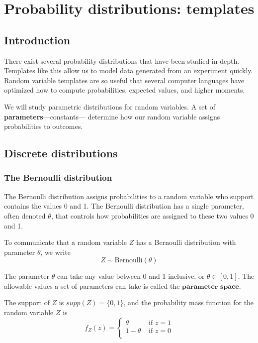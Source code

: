 \chapter{Probability distributions: templates}
\hspace{1mm}

\section{Introduction}\label{intro}

There exist several probability distributions that have been studied in depth.
Templates like this allow us to model data generated from an experiment quickly.
Random variable templates are so useful that several computer languages have optimized how to compute probabilities, expected values, and higher moments.

We will study parametric distributions for random variables.
A set of \textbf{parameters}---constants--- determine how our random variable assigns probabilities to outcomes.

\section{Discrete distributions}
\hspace{1mm}

\subsection{The Bernoulli distribution}

The Bernoulli distribution assigns probabilities to a random variable who support contains the values 0 and 1. The Bernoulli distribution has a single parameter, often denoted $\theta$, that controls how probabilities are assigned to these two values 0 and 1.

To communicate that a random variable $Z$ has a Bernoulli distribution with parameter $\theta$, we write 
\begin{equation}
    Z \sim \text{Bernoulli}(\theta)
\end{equation}

The parameter $\theta$ can take any value between 0 and 1 inclusive, or $\theta \in [0,1]$.
The allowable values a set of parameters can take is called the $\textbf{parameter space}$. 


The support of $Z$ is $supp(Z) = \{0,1\}$, and the probability mass function for the random variable $Z$ is 
\begin{equation}
    f_{Z}(z) = \begin{cases}
                   \theta & \text{ if } z=1\\
                   1- \theta & \text{ if } z=0\\
               \end{cases}
\end{equation}

